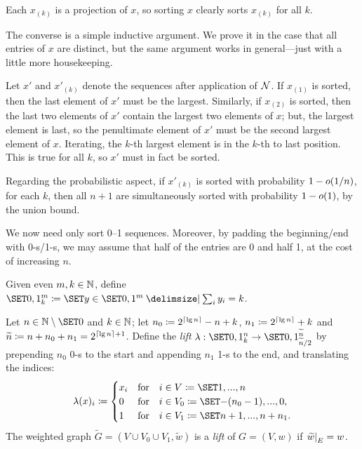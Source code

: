 \documentclass{article}
\newcommand{\wt}{\widetilde}
\begin{document}
\begin{Proof}
Each $x_{(k)}$ is a projection of $x$, so sorting $x$ clearly sorts $x_{(k)}$ for all $k$.

The converse is a simple inductive argument.
We prove it in the case that all entries of $x$ are distinct, but the same argument works in general---just with a little more housekeeping.

Let $x'$ and $x'_{(k)}$ denote the sequences after application of $\mathcal{N}$.
If $x_{(1)}$ is sorted, then the last element of $x'$ must be the largest.
Similarly, if $x_{(2)}$ is sorted, then the last two elements of $x'$ contain the largest two elements of $x$; but, the largest element is last, so the penultimate element of $x'$ must be the second largest element of $x$.
Iterating, the $k$-th largest element is in the $k$-th to last position.
This is true for all $k$, so $x'$ must in fact be sorted.

Regarding the probabilistic aspect, if $x'_{(k)}$ is sorted with probability $1 - o( 1/n )$, for each $k$, then all $n+1$ are simultaneously sorted with probability $1 - o( 1 )$, by the union bound.
\end{Proof}

We now need only sort 0--1 sequences.
Moreover, by padding the beginning/end with 0-s/1-s, we may assume that half of the entries are 0 and half 1, at the cost of increasing $n$.

\begin{defn}
Given even $m, k \in \mathbb{N}$, define $\set{0,1}^m_k \cq \set{ y \in \set{0,1}^m \given \sum_i y_i = k }$.

Let $n \in \mbn \setminus \set{0}$ and $k \in \mathbb{N}$;
let $n_0 \coloneqq 2^{\lceil \lg n \rceil} - n + k$, $n_1 \coloneqq 2^{\lceil \lg n \rceil} + k$ and $\wt n \cq n + n_0 + n_1 = 2^{\ceil{\lg n} + 1}$.
Define the \textit{lift} $\lambda : \set{0,1}^n_k \to \set{0,1}^{\wt n}_{\wt n/2}$ by
	prepending $n_0$ 0-s to the start
and
	appending $n_1$ 1-s to the end,
and translating the indices:
\[
	\lambda(x)_i
\cq
\begin{cases}
	x_i
&\text{for}\quad
	i \in V \cq \set{1, ..., n}
\\
	0
&\text{for}\quad
	i \in V_0 \cq \set{-(n_0-1), ..., 0},
\\
	1
&\text{for}\quad
	i \in V_1 \cq \set{n+1, ..., n+n_1}.
\end{cases}
\]
The weighted graph $\wt G = (V \cup V_0 \cup V_1, \wt w)$ is a \textit{lift} of $G = (V, w)$ if $\fnrestrict{\wt w}{E} = w$.
\end{defn}
\end{document}
